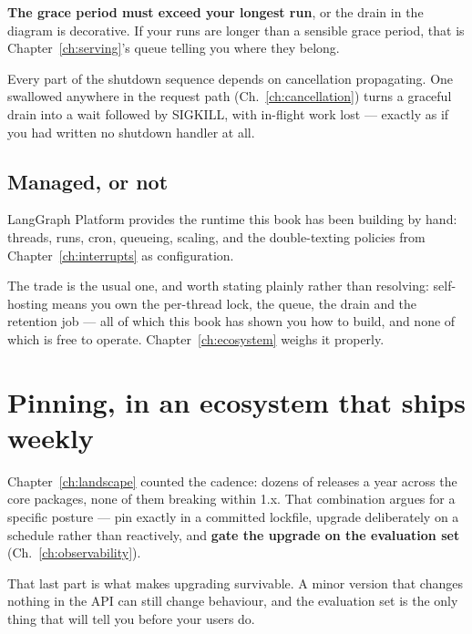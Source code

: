 \textbf{The grace period must exceed your longest run}, or the drain in the
diagram is decorative. If your runs are longer than a sensible grace period, that
is Chapter~\ref{ch:serving}'s queue telling you where they belong.

\begin{warning}
Every part of the shutdown sequence depends on cancellation propagating. One
swallowed  anywhere in the request path
(Ch.~\ref{ch:cancellation}) turns a graceful drain into a wait followed by
SIGKILL, with in-flight work lost --- exactly as if you had written no shutdown
handler at all.
\end{warning}

\subsection{Managed, or not}
\label{sec:platform}

LangGraph Platform provides the runtime this book has been building by hand:
threads, runs, cron, queueing, scaling, and the double-texting policies from
Chapter~\ref{ch:interrupts} as configuration.

The trade is the usual one, and worth stating plainly rather than resolving:
self-hosting means you own the per-thread lock, the queue, the drain and the
retention job --- all of which this book has shown you how to build, and none of
which is free to operate. Chapter~\ref{ch:ecosystem} weighs it properly.

\section{Pinning, in an ecosystem that ships weekly}
\label{sec:pinning}

Chapter~\ref{ch:landscape} counted the cadence: dozens of releases a year across
the core packages, none of them breaking within 1.x. That combination argues for
a specific posture --- pin exactly in a committed lockfile, upgrade deliberately
on a schedule rather than reactively, and \textbf{gate the upgrade on the
evaluation set} (Ch.~\ref{ch:observability}).

That last part is what makes upgrading survivable. A minor version that changes
nothing in the API can still change behaviour, and the evaluation set is the only
thing that will tell you before your users do.

